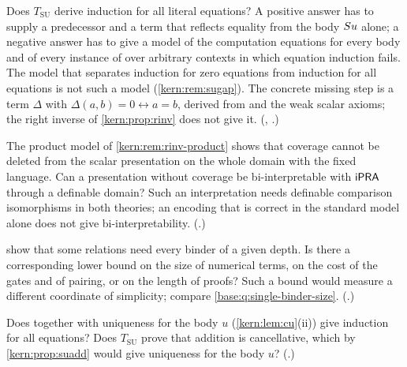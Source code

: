 \begin{question}
\label{kern:q:su}
Does $T_{\mathrm{SU}}$ derive induction for all literal equations?  A
positive answer has to supply a predecessor and a term that reflects
equality from the body $S u$ alone; a negative answer has to give a model
of the computation equations for every body and of every instance of
 over arbitrary contexts in which equation induction fails.
The model that separates induction for zero equations from induction for
all equations is not such a model (\cref{kern:rem:sugap}).  The concrete
missing step is a term $\Delta$ with $\Delta(a,b)=0\leftrightarrow a=b$,
derived from  and the weak scalar axioms; the right inverse of
\cref{kern:prop:rinv} does not give it.
(, .)
\end{question}

\begin{question}
\label{kern:q:coverdomain}
The product model of \cref{kern:rem:rinv-product} shows that coverage cannot
be deleted from the scalar presentation on the whole domain with the fixed
language.  Can a presentation without coverage be bi-interpretable with
$\mathsf{iPRA}$ through a definable domain?  Such an interpretation needs definable
comparison isomorphisms in both theories; an encoding that is correct in
the standard model alone does not give bi-interpretability.
(.)
\end{question}

\begin{question}
\label{kern:q:depthsize}
 show that some relations need
every binder of a given depth.  Is there a corresponding lower bound on the
size of numerical terms, on the cost of the gates and of pairing, or on the
length of proofs?  Such a bound would measure a different coordinate of
simplicity; compare \cref{base:q:single-binder-size}.  (.)
\end{question}

\begin{question}
\label{kern:q:suid}
Does  together with uniqueness for the body $u$
(\cref{kern:lem:cu}(ii)) give induction for all equations?  Does
$T_{\mathrm{SU}}$ prove that addition is cancellative, which by
\cref{kern:prop:suadd} would give uniqueness for the body $u$?
(.)
\end{question}

